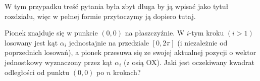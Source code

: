 W tym przypadku treść pytania była zbyt długa by ją wpisać jako tytuł rozdziału, więc w pełnej formie przytoczymy ją dopiero tutaj.

\begin{question} Pionek znajduje się w punkcie \((0, 0)\) na płaszczyźnie. W \(i\)-tym kroku \((i > 1)\) losowany jest kąt \(\alpha_i\) jednostajnie na przedziale \([0, 2\pi]\) (i niezależnie od poprzednich losowań), a pionek przesuwa się ze swojej aktualnej pozycji o wektor jednostkowy wyznaczony przez kąt \(\alpha_i\) (z osią OX). Jaki jest oczekiwany kwadrat odległości od punktu \((0, 0)\) po \(n\) krokach?
\end{question}